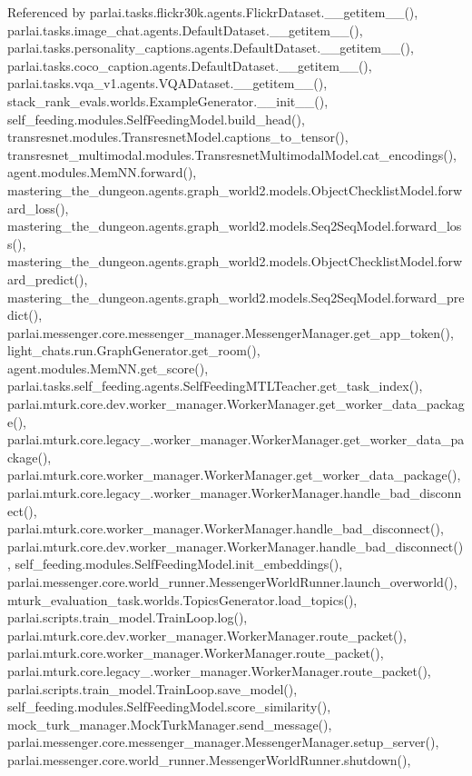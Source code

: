 Referenced by parlai.\+tasks.\+flickr30k.\+agents.\+Flickr\+Dataset.\+\_\+\+\_\+getitem\+\_\+\+\_\+(), parlai.\+tasks.\+image\+\_\+chat.\+agents.\+Default\+Dataset.\+\_\+\+\_\+getitem\+\_\+\+\_\+(), parlai.\+tasks.\+personality\+\_\+captions.\+agents.\+Default\+Dataset.\+\_\+\+\_\+getitem\+\_\+\+\_\+(), parlai.\+tasks.\+coco\+\_\+caption.\+agents.\+Default\+Dataset.\+\_\+\+\_\+getitem\+\_\+\+\_\+(), parlai.\+tasks.\+vqa\+\_\+v1.\+agents.\+V\+Q\+A\+Dataset.\+\_\+\+\_\+getitem\+\_\+\+\_\+(), stack\+\_\+rank\+\_\+evals.\+worlds.\+Example\+Generator.\+\_\+\+\_\+init\+\_\+\+\_\+(), self\+\_\+feeding.\+modules.\+Self\+Feeding\+Model.\+build\+\_\+head(), transresnet.\+modules.\+Transresnet\+Model.\+captions\+\_\+to\+\_\+tensor(), transresnet\+\_\+multimodal.\+modules.\+Transresnet\+Multimodal\+Model.\+cat\+\_\+encodings(), agent.\+modules.\+Mem\+N\+N.\+forward(), mastering\+\_\+the\+\_\+dungeon.\+agents.\+graph\+\_\+world2.\+models.\+Object\+Checklist\+Model.\+forward\+\_\+loss(), mastering\+\_\+the\+\_\+dungeon.\+agents.\+graph\+\_\+world2.\+models.\+Seq2\+Seq\+Model.\+forward\+\_\+loss(), mastering\+\_\+the\+\_\+dungeon.\+agents.\+graph\+\_\+world2.\+models.\+Object\+Checklist\+Model.\+forward\+\_\+predict(), mastering\+\_\+the\+\_\+dungeon.\+agents.\+graph\+\_\+world2.\+models.\+Seq2\+Seq\+Model.\+forward\+\_\+predict(), parlai.\+messenger.\+core.\+messenger\+\_\+manager.\+Messenger\+Manager.\+get\+\_\+app\+\_\+token(), light\+\_\+chats.\+run.\+Graph\+Generator.\+get\+\_\+room(), agent.\+modules.\+Mem\+N\+N.\+get\+\_\+score(), parlai.\+tasks.\+self\+\_\+feeding.\+agents.\+Self\+Feeding\+M\+T\+L\+Teacher.\+get\+\_\+task\+\_\+index(), parlai.\+mturk.\+core.\+dev.\+worker\+\_\+manager.\+Worker\+Manager.\+get\+\_\+worker\+\_\+data\+\_\+package(), parlai.\+mturk.\+core.\+legacy\+\_.\+worker\+\_\+manager.\+Worker\+Manager.\+get\+\_\+worker\+\_\+data\+\_\+package(), parlai.\+mturk.\+core.\+worker\+\_\+manager.\+Worker\+Manager.\+get\+\_\+worker\+\_\+data\+\_\+package(), parlai.\+mturk.\+core.\+legacy\+\_.\+worker\+\_\+manager.\+Worker\+Manager.\+handle\+\_\+bad\+\_\+disconnect(), parlai.\+mturk.\+core.\+worker\+\_\+manager.\+Worker\+Manager.\+handle\+\_\+bad\+\_\+disconnect(), parlai.\+mturk.\+core.\+dev.\+worker\+\_\+manager.\+Worker\+Manager.\+handle\+\_\+bad\+\_\+disconnect(), self\+\_\+feeding.\+modules.\+Self\+Feeding\+Model.\+init\+\_\+embeddings(), parlai.\+messenger.\+core.\+world\+\_\+runner.\+Messenger\+World\+Runner.\+launch\+\_\+overworld(), mturk\+\_\+evaluation\+\_\+task.\+worlds.\+Topics\+Generator.\+load\+\_\+topics(), parlai.\+scripts.\+train\+\_\+model.\+Train\+Loop.\+log(), parlai.\+mturk.\+core.\+dev.\+worker\+\_\+manager.\+Worker\+Manager.\+route\+\_\+packet(), parlai.\+mturk.\+core.\+worker\+\_\+manager.\+Worker\+Manager.\+route\+\_\+packet(), parlai.\+mturk.\+core.\+legacy\+\_.\+worker\+\_\+manager.\+Worker\+Manager.\+route\+\_\+packet(), parlai.\+scripts.\+train\+\_\+model.\+Train\+Loop.\+save\+\_\+model(), self\+\_\+feeding.\+modules.\+Self\+Feeding\+Model.\+score\+\_\+similarity(), mock\+\_\+turk\+\_\+manager.\+Mock\+Turk\+Manager.\+send\+\_\+message(), parlai.\+messenger.\+core.\+messenger\+\_\+manager.\+Messenger\+Manager.\+setup\+\_\+server(), parlai.\+messenger.\+core.\+world\+\_\+runner.\+Messenger\+World\+Runner.\+shutdown(), 